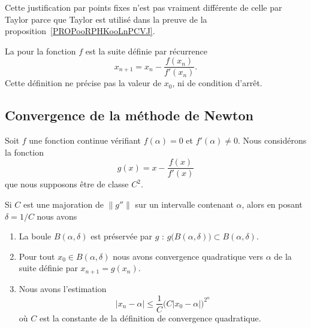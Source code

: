 \begin{remark}
    Cette justification par points fixes n'est pas vraiment différente de celle par Taylor parce que Taylor est utilisé dans la preuve de la proposition~\ref{PROPooRPHKooLnPCVJ}.
\end{remark}

\begin{definition}
    La  pour la fonction \( f\) est la suite définie par récurrence
    \begin{equation}
        x_{n+1}=x_n-\frac{ f(x_n)  }{ f'(x_n) }.
    \end{equation}
    Cette définition ne précise pas la valeur de \( x_0\), ni de condition d'arrêt.
\end{definition}

\subsection{Convergence de la méthode de Newton}

\begin{theorem}       \label{THOooDOVSooWsAFkx}
    Soit \( f\) une fonction continue vérifiant \( f(\alpha)=0\) et \( f'(\alpha)\neq 0\). Nous considérons la fonction
    \begin{equation}
        g(x)=x-\frac{ f(x) }{ f'(x) }
    \end{equation}
    que nous supposons être de classe \( C^2\).

    Si \( C\) est une majoration de \( \| g'' \|\) sur un intervalle contenant \( \alpha\), alors en posant \( \delta=1/C\) nous avons
    \begin{enumerate}
        \item       \label{ITEMooVXSKooWCVWQc}
            La boule \( B(\alpha,\delta)\) est préservée par \( g\) : \( g\big( B(\alpha,\delta) \big)\subset B(\alpha,\delta)\).
        \item       \label{ITEMooZPSXooGgbfhG}
            Pour tout \( x_0\in B(\alpha,\delta)\) nous avons convergence quadratique vers \( \alpha\) de la suite définie par \( x_{n+1}=g(x_n)\).
        \item       \label{ITEMooZCXZooCjeWPl}
            Nous avons l'estimation
            \begin{equation}        \label{EQooFAIPooDpoNWK}
                | x_n-\alpha |\leq \frac{1}{ C }\big( C| x_0-\alpha | \big)^{2^n}
            \end{equation}
            où \( C\) est la constante de la définition de convergence quadratique.
    \end{enumerate}
\end{theorem}

